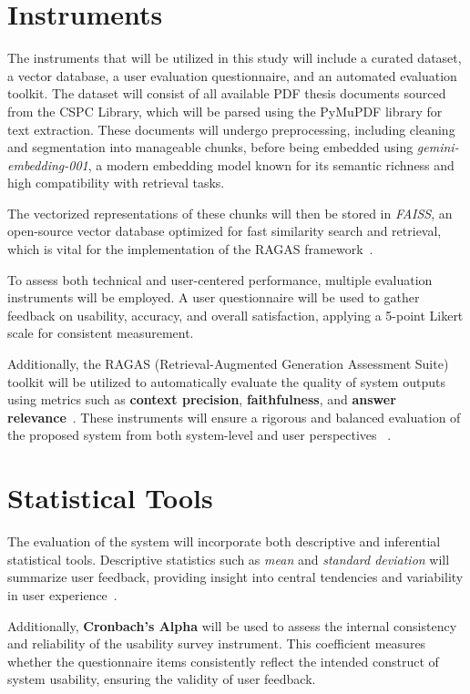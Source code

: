 \begin{refsection}
\section{Instruments}


The instruments that will be utilized in this study will include a curated dataset, a vector database, a user evaluation questionnaire, and an automated evaluation toolkit. The dataset will consist of all available PDF thesis documents sourced from the CSPC Library, which will be parsed using the PyMuPDF library for text extraction. These documents will undergo preprocessing, including cleaning and segmentation into manageable chunks, before being embedded using \textit{gemini-embedding-001}, a modern embedding model known for its semantic richness and high compatibility with retrieval tasks.


The vectorized representations of these chunks will then be stored in \textit{FAISS}, an open-source vector database optimized for fast similarity search and retrieval, which is vital for the implementation of the RAGAS framework~\cite{trychroma2023chroma}.

To assess both technical and user-centered performance, multiple evaluation instruments will be employed. A user questionnaire will be used to gather feedback on usability, accuracy, and overall satisfaction, applying a 5-point Likert scale for consistent measurement.

Additionally, the RAGAS (Retrieval-Augmented Generation Assessment Suite) toolkit will be utilized to automatically evaluate the quality of system outputs using metrics such as \textbf{context precision}, \textbf{faithfulness}, and \textbf{answer relevance}~\cite{shinn2023ragas}. These instruments will ensure a rigorous and balanced evaluation of the proposed system from both system-level and user perspectives~ \cite{lin2021bert}.

\section{Statistical Tools}

The evaluation of the system will incorporate both descriptive and inferential statistical tools. Descriptive statistics such as \textit{mean} and \textit{standard deviation} will summarize user feedback, providing insight into central tendencies and variability in user experience~\cite{holmes2023chatbot}.

Additionally, \textbf{Cronbach’s Alpha} will be used to assess the internal consistency and reliability of the usability survey instrument. This coefficient measures whether the questionnaire items consistently reflect the intended construct of system usability, ensuring the validity of user feedback.


\end{refsection}
